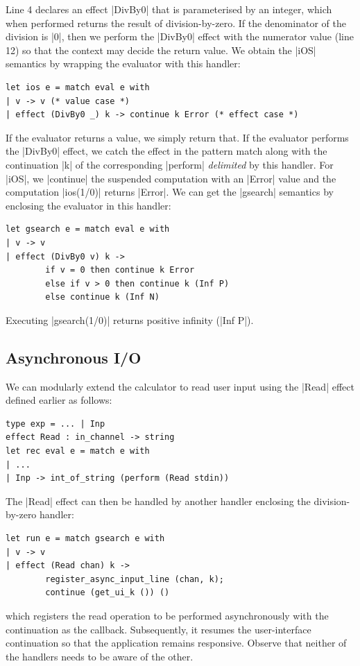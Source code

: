 \documentclass[sigplan,10pt,review,anonymous]{acmart}\settopmatter{printfolios=true,printccs=false,printacmref=false}
\begin{document}
Line 4 declares an effect |DivBy0| that is parameterised by an integer, which
when performed returns the result of division-by-zero. If the denominator of
the division is |0|, then we perform the |DivBy0| effect with the numerator
value (line 12) so that the context may decide the return value. We obtain the
|iOS| semantics by wrapping the evaluator with this handler:
\begin{lstlisting}
let ios e = match eval e with
| v -> v (* value case *)
| effect (DivBy0 _) k -> continue k Error (* effect case *)
\end{lstlisting}
If the evaluator returns a value, we simply return that. If the evaluator
performs the |DivBy0| effect, we catch the effect in the pattern match along with
the continuation |k| of the corresponding |perform| \emph{delimited} by this
handler. For |iOS|, we |continue| the suspended computation with an
|Error| value and the computation |ios(1/0)| returns |Error|.
We can get the |gsearch| semantics by enclosing the evaluator in this handler:
\begin{lstlisting}
let gsearch e = match eval e with
| v -> v
| effect (DivBy0 v) k ->
		if v = 0 then continue k Error
		else if v > 0 then continue k (Inf P)
		else continue k (Inf N)
\end{lstlisting}
Executing |gsearch(1/0)| returns positive infinity (|Inf P|).

\subsection{Asynchronous I/O}
\label{sec:aio}

We can modularly extend the calculator to read user input using the |Read|
effect defined earlier as follows:
\begin{lstlisting}
type exp = ... | Inp
effect Read : in_channel -> string
let rec eval e = match e with
| ...
| Inp -> int_of_string (perform (Read stdin))
\end{lstlisting}
The |Read| effect can then be handled by another handler enclosing the
division-by-zero handler:
\begin{lstlisting}
let run e = match gsearch e with
| v -> v
| effect (Read chan) k ->
		register_async_input_line (chan, k);
		continue (get_ui_k ()) ()
\end{lstlisting}
\noindent which registers the read operation to be performed asynchronously
with the continuation as the callback. Subsequently, it resumes the
user-interface continuation so that the application remains responsive. Observe
that neither of the handlers needs to be aware of the other.
\end{document}
